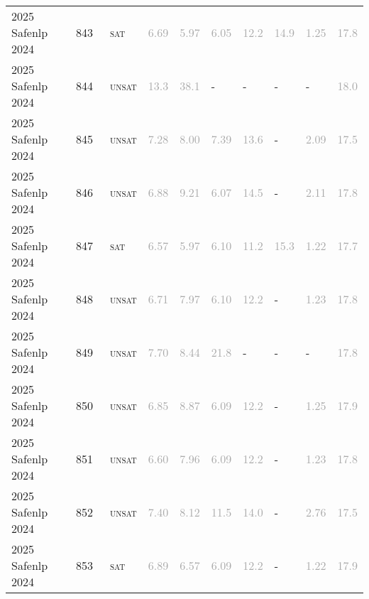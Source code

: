 \begin{center}
{\begin{longtable}{@{}llllllllll@{}}
2025 Safenlp 2024 & 843 & ~\textsc{sat} & \textcolor{darkgray}{6.69} & \textcolor{darkgray}{5.97} & \textcolor{darkgray}{6.05} & \textcolor{darkgray}{12.2} & \textcolor{darkgray}{14.9} & \textcolor{darkgray}{1.25} & \textcolor{darkgray}{17.8} \\
2025 Safenlp 2024 & 844 & ~\textsc{unsat} & \textcolor{darkgray}{13.3} & \textcolor{darkgray}{38.1} & - & - & - & - & \textcolor{darkgray}{18.0} \\
2025 Safenlp 2024 & 845 & ~\textsc{unsat} & \textcolor{darkgray}{7.28} & \textcolor{darkgray}{8.00} & \textcolor{darkgray}{7.39} & \textcolor{darkgray}{13.6} & - & \textcolor{darkgray}{2.09} & \textcolor{darkgray}{17.5} \\
2025 Safenlp 2024 & 846 & ~\textsc{unsat} & \textcolor{darkgray}{6.88} & \textcolor{darkgray}{9.21} & \textcolor{darkgray}{6.07} & \textcolor{darkgray}{14.5} & - & \textcolor{darkgray}{2.11} & \textcolor{darkgray}{17.8} \\
2025 Safenlp 2024 & 847 & ~\textsc{sat} & \textcolor{darkgray}{6.57} & \textcolor{darkgray}{5.97} & \textcolor{darkgray}{6.10} & \textcolor{darkgray}{11.2} & \textcolor{darkgray}{15.3} & \textcolor{darkgray}{1.22} & \textcolor{darkgray}{17.7} \\
2025 Safenlp 2024 & 848 & ~\textsc{unsat} & \textcolor{darkgray}{6.71} & \textcolor{darkgray}{7.97} & \textcolor{darkgray}{6.10} & \textcolor{darkgray}{12.2} & - & \textcolor{darkgray}{1.23} & \textcolor{darkgray}{17.8} \\
2025 Safenlp 2024 & 849 & ~\textsc{unsat} & \textcolor{darkgray}{7.70} & \textcolor{darkgray}{8.44} & \textcolor{darkgray}{21.8} & - & - & - & \textcolor{darkgray}{17.8} \\
2025 Safenlp 2024 & 850 & ~\textsc{unsat} & \textcolor{darkgray}{6.85} & \textcolor{darkgray}{8.87} & \textcolor{darkgray}{6.09} & \textcolor{darkgray}{12.2} & - & \textcolor{darkgray}{1.25} & \textcolor{darkgray}{17.9} \\
2025 Safenlp 2024 & 851 & ~\textsc{unsat} & \textcolor{darkgray}{6.60} & \textcolor{darkgray}{7.96} & \textcolor{darkgray}{6.09} & \textcolor{darkgray}{12.2} & - & \textcolor{darkgray}{1.23} & \textcolor{darkgray}{17.8} \\
2025 Safenlp 2024 & 852 & ~\textsc{unsat} & \textcolor{darkgray}{7.40} & \textcolor{darkgray}{8.12} & \textcolor{darkgray}{11.5} & \textcolor{darkgray}{14.0} & - & \textcolor{darkgray}{2.76} & \textcolor{darkgray}{17.5} \\
2025 Safenlp 2024 & 853 & ~\textsc{sat} & \textcolor{darkgray}{6.89} & \textcolor{darkgray}{6.57} & \textcolor{darkgray}{6.09} & \textcolor{darkgray}{12.2} & - & \textcolor{darkgray}{1.22} & \textcolor{darkgray}{17.9} \\

\end{longtable}}
\end{center}
